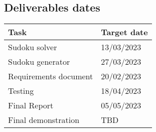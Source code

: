 \documentclass[a4paper,10pt]{article}
\begin{document}
\subsection*{Deliverables dates}
\begin{table}[H]
	\begin{tabular}{|l|l|}
		\hline
		Task                  & Target date \\ \hline
		Sudoku solver         & 13/03/2023  \\ \hline
		Sudoku generator      & 27/03/2023  \\ \hline
		Requirements document & 20/02/2023  \\ \hline
		Testing               & 18/04/2023  \\ \hline
		Final Report          & 05/05/2023  \\ \hline
		Final demonstration   & TBD         \\ \hline
	\end{tabular}
\end{table}
\newpage
\end{document}
